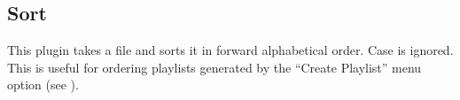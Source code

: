 \subsection{Sort}
This plugin takes a file and sorts it in  forward alphabetical order.  Case is
ignored.  This is useful for ordering playlists generated by the ``Create Playlist'' menu option (see ).



